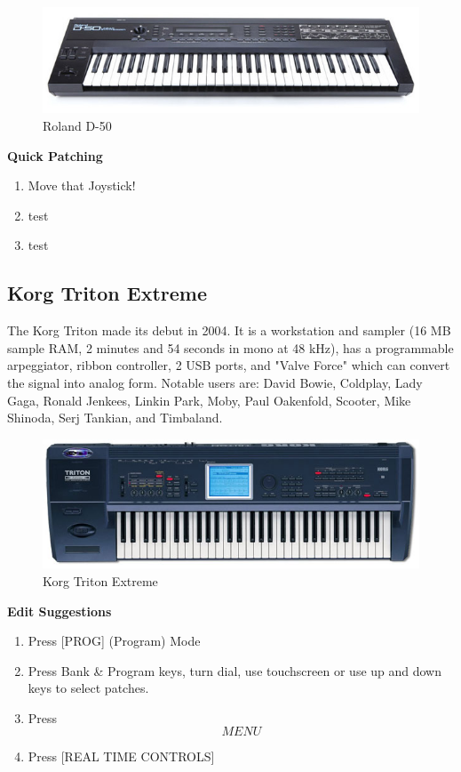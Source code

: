 \documentclass{tufte-book} %
\begin{document}
\begin{figure}[h]
\centering
\includegraphics[width=.85\textwidth]{LaTeX/roland_d50.jpg}
\caption{Roland D-50}
\label{fig:fullfig}
\end{figure}

\begin{fullwidth}
\textbf{Quick Patching}\\
\begin{enumerate}
	\item Move that Joystick! 
	\item test
	\item test
\end{enumerate}
\end{fullwidth}


\newpage
\subsection{Korg Triton Extreme}
\begin{fullwidth}
The Korg Triton made its debut in 2004. It is a workstation and sampler (16 MB sample RAM, 2 minutes and 54 seconds in mono at 48 kHz), has a programmable arpeggiator, ribbon controller, 2 USB ports, and "Valve Force" which can convert the signal into analog form. Notable users are: David Bowie, Coldplay, Lady Gaga, Ronald Jenkees, Linkin Park, Moby, Paul Oakenfold, Scooter, Mike Shinoda, Serj Tankian, and Timbaland.
\end{fullwidth}


\begin{figure}[h]
\centering
\includegraphics[width=.85\textwidth]{LaTeX/tritonextreme.jpg}
\caption{Korg Triton Extreme}
\label{fig:fullfig}
\end{figure}

\textbf{Edit Suggestions}
\begin{enumerate}
	\item Press [PROG] (Program) Mode
	\item Press Bank & Program keys, turn dial, use touchscreen or use up and down keys to select patches.
	\item Press \[MENU\] 
	\item Press [REAL TIME CONTROLS] 
\end{enumerate}
\end{document}

